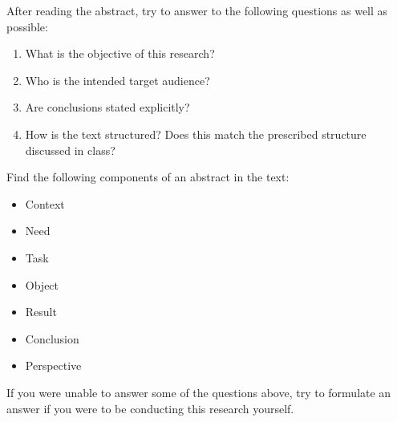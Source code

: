 \begin{exercise}
  After reading the abstract, try to answer to the following questions as well as possible:
  
  \begin{enumerate}
    \item What is the objective of this research?
    \item Who is the intended target audience?
    \item Are conclusions stated explicitly? 
    \item How is the text structured? Does this match the prescribed structure discussed in class?
  \end{enumerate}
\end{exercise}

\begin{exercise}
  Find the following components of an abstract in the text:
  
  \begin{itemize}
    \item Context
    \item Need
    \item Task
    \item Object
    \item Result
    \item Conclusion
    \item Perspective
  \end{itemize}
\end{exercise}

\begin{exercise}
  If you were unable to answer some of the questions above, try to formulate an answer if you were to be conducting this research yourself.
\end{exercise}
